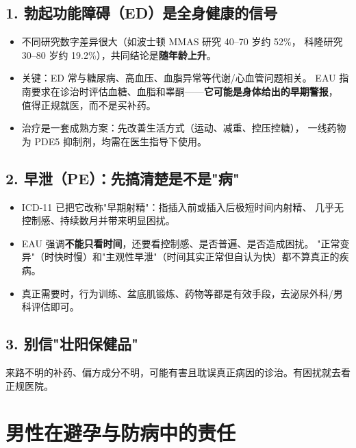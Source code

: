 \documentclass[12pt,UTF8,openany]{ctexbook}
\begin{document}
\subsection*{1. 勃起功能障碍（ED）是全身健康的信号}

\begin{itemize}[leftmargin=2em]
  \item 不同研究数字差异很大（如波士顿 MMAS 研究 40--70 岁约 52\%，
        科隆研究 30--80 岁约 19.2\%），共同结论是\textbf{随年龄上升}。
  \item 关键：ED 常与糖尿病、高血压、血脂异常等代谢/心血管问题相关。
        EAU 指南要求在诊治时评估血糖、血脂和睾酮——\textbf{它可能是身体给出的早期警报}，
        值得正规就医，而不是买补药。
  \item 治疗是一套成熟方案：先改善生活方式（运动、减重、控压控糖），
        一线药物为 PDE5 抑制剂，均需在医生指导下使用。
\end{itemize}

\subsection*{2. 早泄（PE）：先搞清楚是不是"病"}

\begin{itemize}[leftmargin=2em]
  \item ICD-11 已把它改称"早期射精"：指插入前或插入后极短时间内射精、
        几乎无控制感、持续数月并带来明显困扰。
  \item EAU 强调\textbf{不能只看时间}，还要看控制感、是否普遍、是否造成困扰。
        "正常变异"（时快时慢）和"主观性早泄"（时间其实正常但自认为快）都不算真正的疾病。
  \item 真正需要时，行为训练、盆底肌锻炼、药物等都是有效手段，去泌尿外科/男科评估即可。
\end{itemize}

\subsection*{3. 别信"壮阳保健品"}

来路不明的补药、偏方成分不明，可能有害且耽误真正病因的诊治。有困扰就去看正规医院。

\section{男性在避孕与防病中的责任}
\end{document}
